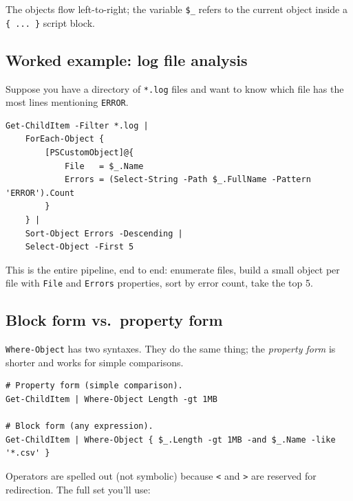\documentclass[11pt,a4paper]{article}
\newcommand{\cmd}[1]{\texttt{\textcolor{pwshKw}{#1}}}
\begin{document}
The objects flow left-to-right; the variable \texttt{\$\_} refers to
the current object inside a \texttt{\{ ... \}} script block.

\subsection*{Worked example: log file analysis}

Suppose you have a directory of \texttt{*.log} files and want to know
which file has the most lines mentioning \texttt{ERROR}.

\begin{lstlisting}[style=pwshstyle]
Get-ChildItem -Filter *.log |
    ForEach-Object {
        [PSCustomObject]@{
            File   = $_.Name
            Errors = (Select-String -Path $_.FullName -Pattern 'ERROR').Count
        }
    } |
    Sort-Object Errors -Descending |
    Select-Object -First 5
\end{lstlisting}

This is the entire pipeline, end to end: enumerate files, build a small
object per file with \texttt{File} and \texttt{Errors} properties, sort
by error count, take the top 5.

\subsection*{Block form vs.\ property form}

\cmd{Where-Object} has two syntaxes. They do the same thing; the
\emph{property form} is shorter and works for simple comparisons.

\begin{lstlisting}[style=pwshstyle]
# Property form (simple comparison).
Get-ChildItem | Where-Object Length -gt 1MB

# Block form (any expression).
Get-ChildItem | Where-Object { $_.Length -gt 1MB -and $_.Name -like '*.csv' }
\end{lstlisting}

Operators are spelled out (not symbolic) because \texttt{<} and \texttt{>}
are reserved for redirection. The full set you'll use:
\end{document}
